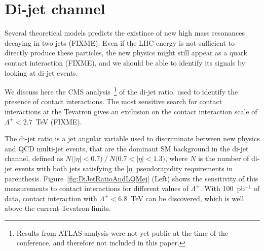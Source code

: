 \documentclass{cimento}
\begin{document}
\section{Di-jet channel} \label{dijet}
Several theoretical models predicts the existince of new 
high mass resonances decaying in two jets (FIXME).
Even if the LHC energy is not sufficient to directly produce 
these particles, the new physics might still appear as 
a quark contact interaction (FIXME), and we should 
be able to identify its signals by looking at di-jet events.

We discuss here the CMS analysis~\footnote{Results 
from ATLAS analysis were not yet public at the time 
of the conference, and therefore not included in this paper.}
of the di-jet ratio, used to identify the presence of contact interactions. 
The most sensitive search for contact interactions at the Tevatron 
gives an exclusion on the contact interaction scale 
of $\Lambda^{+} < 2.7$~TeV (FIXME).  

The di-jet ratio is a jet angular variable used to 
discriminate between new physics and QCD multi-jet events, 
that are the dominant SM background in the di-jet channel, defined as  
$N\mbox{(}|\eta|<0.7\mbox{)}~/~N\mbox{(}0.7<|\eta|< 1.3 \mbox{)}$, 
where $N$ is the number of di-jet events with both jets satisfying the 
$|\eta|$ pseudorapidity requirements in parenthesis. 
Figure~\ref{fig:DiJetRatioAndLQMej} (Left) shows the sensitivity of this 
measurements to contact interactions for different values of $\Lambda^{+}$. 
With 100~pb$^{-1}$ of data, contact interaction with
$\Lambda^{+} < 6.8$~TeV can be discovered, which is well above the 
current Tevatron limits.
 
\end{document}
